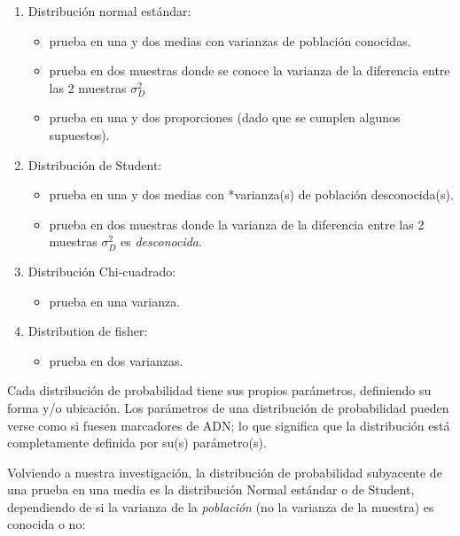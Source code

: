 \documentclass[
]{book}
\providecommand{\tightlist}{%
  \setlength{\itemsep}{0pt}\setlength{\parskip}{0pt}}
\begin{document}
\begin{enumerate}
\def\labelenumi{\arabic{enumi}.}
\tightlist
\item
  Distribución normal estándar:

  \begin{itemize}
  \tightlist
  \item
    prueba en una y dos medias con varianzas de población conocidas.
  \item
    prueba en dos muestras donde se conoce la varianza de la diferencia entre las 2 muestras \(\sigma^2_D\)
  \item
    prueba en una y dos proporciones (dado que se cumplen algunos supuestos).
  \end{itemize}
\item
  Distribución de Student:

  \begin{itemize}
  \tightlist
  \item
    prueba en una y dos medias con *varianza(s) de población desconocida(s).
  \item
    prueba en dos muestras donde la varianza de la diferencia entre las 2 muestras \(\sigma^2_D\) es \emph{desconocida}.
  \end{itemize}
\item
  Distribución Chi-cuadrado:

  \begin{itemize}
  \tightlist
  \item
    prueba en una varianza.
  \end{itemize}
\item
  Distribution de fisher:

  \begin{itemize}
  \tightlist
  \item
    prueba en dos varianzas.
  \end{itemize}
\end{enumerate}

Cada distribución de probabilidad tiene sus propios parámetros, definiendo su forma y/o ubicación. Los parámetros de una distribución de probabilidad pueden verse como si fuesen marcadores de ADN; lo que significa que la distribución está completamente definida por su(s) parámetro(s).

Volviendo a nuestra investigación, la distribución de probabilidad subyacente de una prueba en una media es la distribución Normal estándar o de Student, dependiendo de si la varianza de la \emph{población} (no la varianza de la muestra) es conocida o no:
\end{document}
